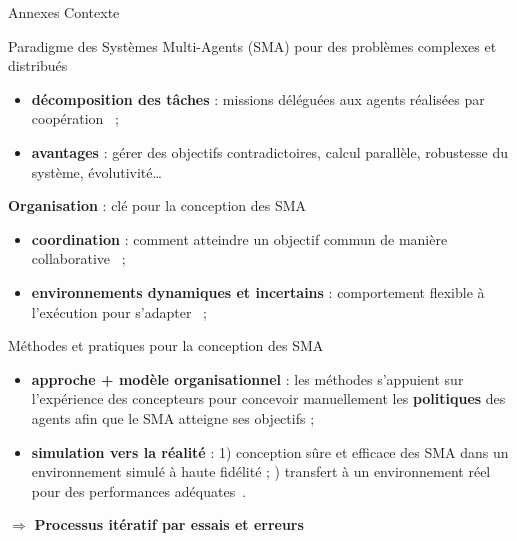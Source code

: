 \begin{frame}[allowframebreaks]{Annexes} {Contexte}

    \begin{block}{Paradigme des Systèmes Multi-Agents (SMA) pour des problèmes complexes et distribués}
        \begin{itemize}
            \item \textbf{décomposition des tâches} : missions déléguées aux agents réalisées par coopération~\parencite{Raileanu2023} ;
            \item \textbf{avantages} : gérer des objectifs contradictoires, calcul parallèle, robustesse du système, évolutivité\dots
        \end{itemize}
    \end{block}
    
    \begin{block}{\textbf{Organisation} : clé pour la conception des SMA}
        \begin{itemize}
            \item \textbf{coordination} : comment atteindre un objectif commun de manière collaborative~\parencite{Hubner2007} ;
            \item \textbf{environnements dynamiques et incertains} : comportement flexible à l'exécution pour s'adapter~\parencite{Kathleen2020} ;
        \end{itemize}
    \end{block}
    
    \begin{block}{Méthodes et pratiques pour la conception des SMA}
        \begin{itemize}
            \item \textbf{approche + modèle organisationnel} : les méthodes s'appuient sur l'expérience des concepteurs pour concevoir manuellement les \textbf{politiques} des agents afin que le SMA atteigne ses objectifs ;
            \item \textbf{simulation vers la réalité} : 1) conception sûre et efficace des SMA dans un environnement simulé à haute fidélité ; ) transfert à un environnement réel pour des performances adéquates~\parencite{Schon2021}.
        \end{itemize}
        \quad $\Longrightarrow$ \textbf{Processus itératif par essais et erreurs}
    \end{block}

\end{frame}

